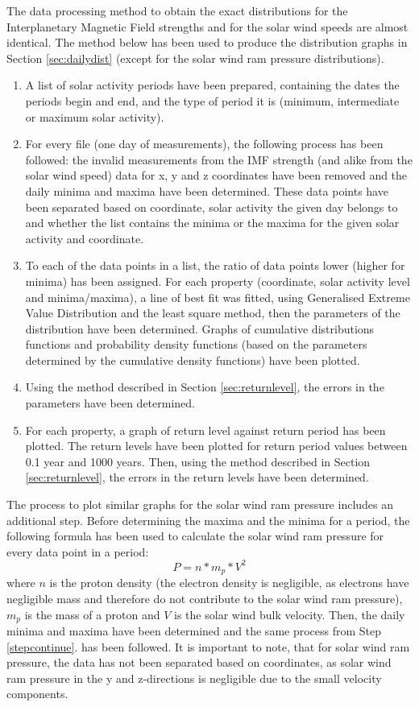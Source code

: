 \documentclass[12pt]{article}
\begin{document}
        The data processing method to obtain the exact distributions for the Interplanetary Magnetic Field strengths and for the solar wind speeds are almost identical. The method below has been used to produce the distribution graphs in Section \ref{sec:dailydist} (except for the solar wind ram pressure distributions).
        \begin{enumerate}
            \item A list of solar activity periods have been prepared, containing the dates the periods begin and end, and the type of period it is (minimum, intermediate or maximum solar activity).
            \item For every file (one day of measurements), the following process has been followed: the invalid measurements from the IMF strength (and alike from the solar wind speed) data for x, y and z coordinates have been removed and the daily minima and maxima have been determined. These data points have been separated based on coordinate, solar activity the given day belongs to and whether the list contains the minima or the maxima for the given solar activity and coordinate.\label{stepcontinue}
            \item To each of the data points in a list, the ratio of data points lower (higher for minima) has been assigned. For each property (coordinate, solar activity level and minima/maxima), a line of best fit was fitted, using Generalised Extreme Value Distribution and the least square method, then the parameters of the distribution have been determined. Graphs of cumulative distributions functions and probability density functions (based on the parameters determined by the cumulative density functions) have been plotted.
            \item Using the method described in Section \ref{sec:returnlevel}, the errors in the parameters have been determined.
            \item For each property, a graph of return level against return period has been plotted. The return levels have been plotted for return period values between 0.1 year and 1000 years. Then, using the method described in Section \ref{sec:returnlevel}, the errors in the return levels have been determined.
        \end{enumerate}
        The process to plot similar graphs for the solar wind ram pressure includes an additional step. Before determining the maxima and the minima for a period, the following formula has been used to calculate the solar wind ram pressure for every data point in a period:
        \begin{equation}
            P=n*m_p*V^2
        \end{equation}
        where $n$ is the proton density (the electron density is negligible, as electrons have negligible mass and therefore do not contribute to the solar wind ram pressure), $m_p$ is the mass of a proton and $V$ is the solar wind bulk velocity. Then, the daily minima and maxima have been determined and the same process from Step \ref{stepcontinue}. has been followed. It is important to note, that for solar wind ram pressure, the data has not been separated based on coordinates, as solar wind ram pressure in the y and z-directions is negligible due to the small velocity components.
\end{document}
